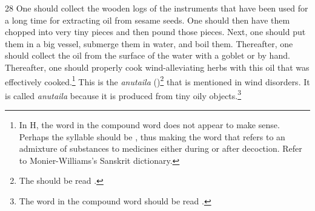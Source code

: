 \begin{translation}
\begin{tt}
    \item[28]
    One should collect the wooden logs of the instruments that have been used 
    for a long time for extracting oil from sesame seeds. One should then have 
    them chopped into very tiny pieces and then pound those pieces. Next, one 
    should put them in a big vessel, submerge them in water, and boil them. 
    Thereafter, one should collect the oil from the surface of the water with a 
    goblet or by hand. Thereafter, one should properly cook wind-alleviating 
    herbs with this oil that was effectively cooked.\footnote{In H, the word 
     in the compound word 
     does not appear to make sense. 
    Perhaps the syllable  should be , thus making the word 
     that refers to an admixture of substances to medicines 
    either during or after decoction. Refer to Monier-Williams's Sanskrit 
    dictionary.} This is the \textit{anutaila} ()\footnote{The 
     should be read .} that is mentioned in wind disorders. It is 
    called \textit{anutaila} because it is produced from tiny oily 
    objects.\footnote{The word  in the compound word 
     should be read .} 


\end{tt}
\end{translation}
